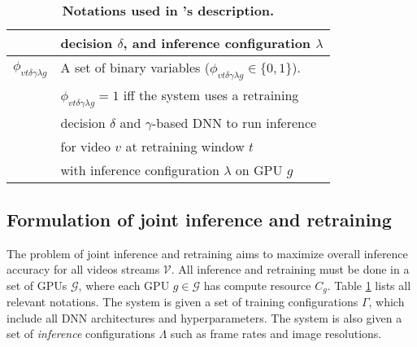 \begin{table}[t!]
\begin{tabular}{cl}
                                   & decision $\delta$, and inference configuration $\lambda$ \\\hline
$\phi_{vt\delta\gamma\lambda g}$ & A set of binary variables ($\phi_{vt\delta\gamma\lambda g}\in\{0,1\}$). \\
& $\phi_{vt\delta\gamma\lambda g} = 1$ iff the system uses a retraining \\
& decision $\delta$ and $\gamma$-based DNN to run inference\\
& for video $v$ at retraining window $t$ \\
& with inference configuration $\lambda$ on GPU $g$\\\hline
\end{tabular}
\caption{\label{tab:notations}\small\bf Notations used in {\name}'s description.}
\end{table}

\subsection{\hspace{-0.2cm}Formulation of joint inference and retraining}
\label{subsec:formulation}

The problem of joint inference and retraining aims to maximize overall inference accuracy for all videos streams $\mathcal{V}$. %
All inference and retraining must be done in a set of GPUs $\mathcal{G}$, where each GPU $g \in \mathcal{G}$ has compute resource $C_g$.
Table \ref{tab:notations} lists all relevant notations. 
The system is given a set of training configurations $\Gamma$, which include all DNN architectures and hyperparameters. 
The system is also given a set of \emph{inference} configurations $\Lambda$ such as frame rates and image resolutions.

